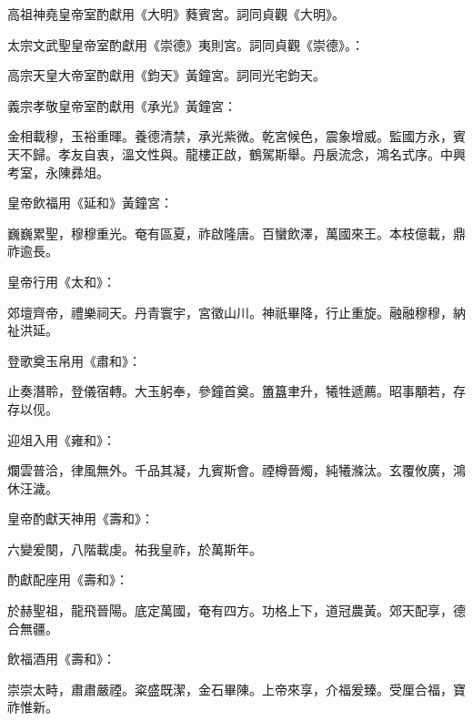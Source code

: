 \begin{pinyinscope}
 高祖神堯皇帝室酌獻用《大明》蕤賓宮。詞同貞觀《大明》。



 太宗文武聖皇帝室酌獻用《崇德》夷則宮。詞同貞觀《崇德》。：



 高宗天皇大帝室酌獻用《鈞天》黃鐘宮。詞同光宅鈞天。



 義宗孝敬皇帝室酌獻用《承光》黃鐘宮：



 金相載穆，玉裕重暉。養德清禁，承光紫微。乾宮候色，震象增威。監國方永，賓天不歸。孝友自衷，溫文性與。龍樓正啟，鶴駕斯舉。丹扆流念，鴻名式序。中興考室，永陳彞俎。



 皇帝飲福用《延和》黃鐘宮：



 巍巍累聖，穆穆重光。奄有區夏，祚啟隆唐。百蠻飲澤，萬國來王。本枝億載，鼎祚逾長。



 皇帝行用《太和》：



 郊壇齊帝，禮樂祠天。丹青寰宇，宮徵山川。神祇畢降，行止重旋。融融穆穆，納祉洪延。



 登歌奠玉帛用《肅和》：



 止奏潛聆，登儀宿轉。大玉躬奉，參鐘首奠。簠簋聿升，犧牲遞薦。昭事顒若，存存以伣。



 迎俎入用《雍和》：



 爛雲普洽，律風無外。千品其凝，九賓斯會。禋樽晉燭，純犧滌汰。玄覆攸廣，鴻休汪濊。



 皇帝酌獻天神用《壽和》：



 六變爰闋，八階載虔。祐我皇祚，於萬斯年。



 酌獻配座用《壽和》：



 於赫聖祖，龍飛晉陽。底定萬國，奄有四方。功格上下，道冠農黃。郊天配享，德合無疆。



 飲福酒用《壽和》：



 崇崇太畤，肅肅嚴禋。粢盛既潔，金石畢陳。上帝來享，介福爰臻。受厘合福，寶祚惟新。




\end{pinyinscope}
